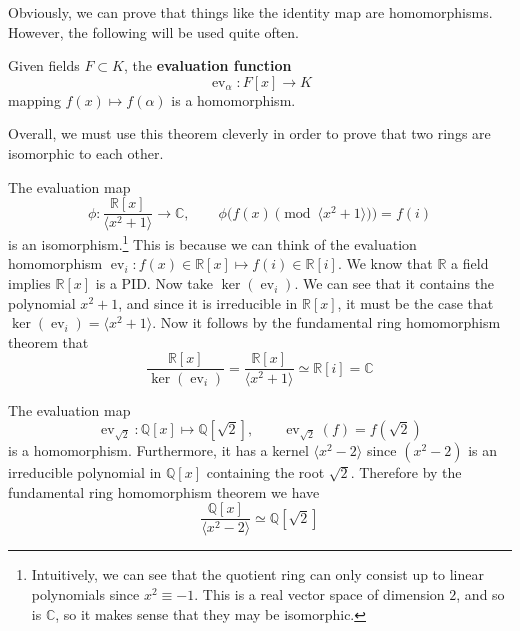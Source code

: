 \documentclass{article}
\DeclareMathOperator{\ev}{ev}
\begin{document}
  Obviously, we can prove that things like the identity map are homomorphisms. However, the following will be used quite often. 

  \begin{example}
    Given fields $F \subset K$, the \textbf{evaluation function} 
    \begin{equation}
      \ev_\alpha: F[x] \rightarrow K
    \end{equation}
    mapping $f(x) \mapsto f(\alpha)$ is a homomorphism. 
  \end{example}

  Overall, we must use this theorem cleverly in order to prove that two rings are isomorphic to each other. 

  \begin{example}
    The evaluation map 
    \begin{equation}
      \phi: \frac{\mathbb{R}[x]}{\langle x^2 + 1 \rangle} \rightarrow \mathbb{C}, \qquad \phi\big( f(x) \pmod{\langle x^2 + 1 \rangle} \big) = f(i)
    \end{equation}
    is an isomorphism.\footnote{Intuitively, we can see that the quotient ring can only consist up to linear polynomials since $x^2 \equiv -1$. This is a real vector space of dimension $2$, and so is $\mathbb{C}$, so it makes sense that they may be isomorphic. } This is because we can think of the evaluation homomorphism $\ev_i : f(x) \in \mathbb{R}[x] \mapsto f(i) \in \mathbb{R}[i]$. We know that $\mathbb{R}$ a field implies $\mathbb{R}[x]$ is a PID. Now take $\ker(\ev_i)$. We can see that it contains the polynomial $x^2 + 1$, and since it is irreducible in $\mathbb{R}[x]$, it must be the case that $\ker(\ev_i) = \langle x^2 + 1 \rangle$. Now it follows by the fundamental ring homomorphism theorem that 
    \begin{equation}
      \frac{\mathbb{R}[x]}{\ker(\ev_i)} = \frac{\mathbb{R}[x]}{\langle x^2 + 1 \rangle} \simeq \mathbb{R}[i] = \mathbb{C}
    \end{equation}
  \end{example} 

  \begin{example}
    The evaluation map 
    \begin{equation}
      \ev_{\sqrt{2}}: \mathbb{Q}[x] \mapsto \mathbb{Q}[\sqrt{2}], \qquad \ev_{\sqrt{2}} (f) = f(\sqrt{2}) 
    \end{equation}
    is a homomorphism. Furthermore, it has a kernel $\langle x^2 - 2 \rangle$ since $(x^2 - 2)$ is an irreducible polynomial in $\mathbb{Q}[x]$ containing the root $\sqrt{2}$. Therefore by the fundamental ring homomorphism theorem we have 
    \begin{equation}
      \frac{\mathbb{Q}[x]}{\langle x^2 - 2 \rangle} \simeq \mathbb{Q}[\sqrt{2}]
    \end{equation}
  \end{example} 
\end{document}

